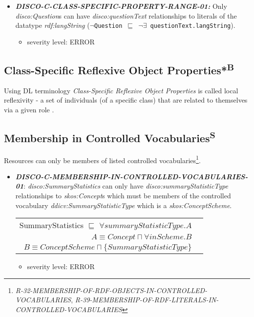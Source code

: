 \documentclass{llncs}
\newcommand{\ms}[1]{\texttt{#1}}
\newenvironment{DL}{
  \vspace{0cm}
  \begin{tabular}{r l}

}{
  \end{tabular}
}
\begin{document}
\begin{itemize}
	\item \textbf{{\em DISCO-C-CLASS-SPECIFIC-PROPERTY-RANGE-01:}}
Only {\em disco:Question}s can have {\em disco:questionText} relationships to literals of the datatype {\em rdf:langString} (\ms{$\neg$Question $\sqsubseteq$ $\neg\exists$ questionText.langString}).
	\begin{itemize}
		\item severity level: ERROR
	\end{itemize}
\end{itemize}

\subsection{Class-Specific Reflexive Object Properties*\textsuperscript{B}}

Using DL terminology \emph{Class-Specific Reflexive Object Properties} is called local reflexivity - a set of individuals (of a specific class) that are related to themselves via a given role \cite{Kroetzsch2012}.

\subsection{Membership in Controlled Vocabularies\textsuperscript{S}}

Resources can only be members of listed controlled vocabularies\footnote{{\em R-32-MEMBERSHIP-OF-RDF-OBJECTS-IN-CONTROLLED-VOCABULARIES}, 
{\em R-39-MEMBERSHIP-OF-RDF-LITERALS-IN-CONTROLLED-VOCABULARIES}}.

\begin{itemize}
	\item \textbf{{\em DISCO-C-MEMBERSHIP-IN-CONTROLLED-VOCABULARIES-01}}:
{\em disco:SummaryStatistics} can only have {\em disco:summaryStatisticType} relationships to {\em skos:Concept}s which must be members of the controlled vocabulary {\em ddicv:SummaryStatisticType} which is a {\em skos:ConceptScheme}.

\begin{DL}
SummaryStatistics $\sqsubseteq$ $\forall summaryStatisticType.A$ \\
$A \equiv Concept \sqcap \forall inScheme . B$ \\
$B \equiv ConceptScheme \sqcap \{SummaryStatisticType\}$
\end{DL}

\begin{itemize}
		\item severity level: ERROR
	\end{itemize}
\end{itemize}
\end{document}
